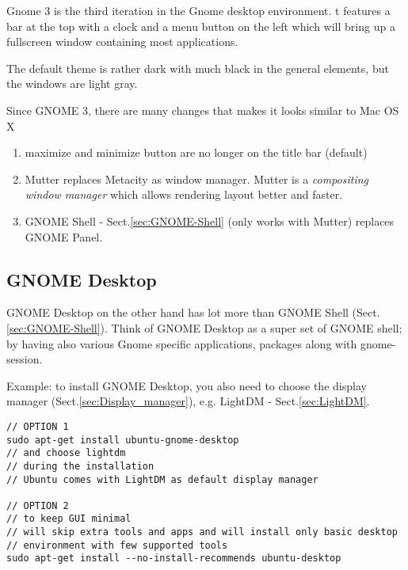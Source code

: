 Gnome 3 is the third iteration in the Gnome desktop environment. t features a
bar at the top with a clock and a menu button on the left which will bring up a
fullscreen window containing most applications. 

The default theme is rather dark with much black in the general elements, but
the windows are light gray. 


Since GNOME 3, there are many changes that makes it looks similar to Mac OS X
\begin{enumerate}
  \item maximize and minimize button are no longer on the title bar (default)
  
  \item Mutter replaces Metacity as window manager. Mutter is a {\it
  compositing window manager} which allows rendering layout better and faster.
  
  \item GNOME Shell - Sect.\ref{sec:GNOME-Shell} (only works with Mutter)
  replaces GNOME Panel.
  
\end{enumerate}

\subsection{GNOME Desktop}
\label{sec:GNOME-desktop}

GNOME Desktop on the other hand has lot more than GNOME Shell
(Sect.\ref{sec:GNOME-Shell}). Think of GNOME Desktop as a super set of GNOME
shell; by having also various Gnome specific applications, packages along with
gnome-session.

Example: to install GNOME Desktop, you also need to choose the display manager
(Sect.\ref{sec:Display_manager}), e.g. LightDM - Sect.\ref{sec:LightDM}.

\begin{verbatim}
// OPTION 1
sudo apt-get install ubuntu-gnome-desktop
// and choose lightdm
// during the installation
// Ubuntu comes with LightDM as default display manager

// OPTION 2
// to keep GUI minimal
// will skip extra tools and apps and will install only basic desktop
// environment with few supported tools
sudo apt-get install --no-install-recommends ubuntu-desktop
\end{verbatim}


